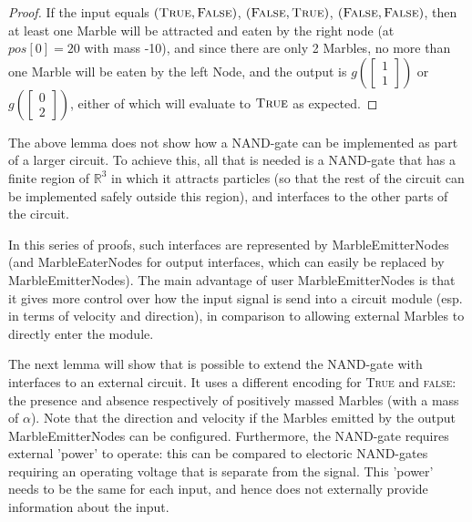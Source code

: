 \begin{proof}
    If the input equals $(\textsc{True}, \textsc{False})$, $(\textsc{False}, \textsc{True})$, $(\textsc{False}, \textsc{False})$, then at least one Marble will be attracted and eaten by the right node (at $pos[0] = 20$ with mass -10), and since there are only 2 Marbles, no more than one Marble will be eaten by the left Node, and the output is $g(\begin{bmatrix}1\\1\end{bmatrix})$ or $g(\begin{bmatrix}0\\2\end{bmatrix})$, either of which will evaluate to $\textsc{True}$ as expected.
\end{proof}

The above lemma does not show how a NAND-gate can be implemented as part of a larger circuit. To achieve this, all that is needed is a NAND-gate that has a finite region of $\mathbb{R}^3$ in which it attracts particles (so that the rest of the circuit can be implemented safely outside this region), and interfaces to the other parts of the circuit. 

In this series of proofs, such interfaces are represented by MarbleEmitterNodes (and MarbleEaterNodes for output interfaces, which can easily be replaced by MarbleEmitterNodes). The main advantage of user MarbleEmitterNodes is that it gives more control over how the input signal is send into a circuit module (esp. in terms of velocity and direction), in comparison to allowing external Marbles to directly enter the module.

The next lemma will show that is possible to extend the NAND-gate with interfaces to an external circuit. It uses a different encoding for \textsc{True} and \textsc{false}: the presence and absence respectively of positively massed Marbles (with a mass of $\alpha$). Note that the direction and velocity if the Marbles emitted by the output MarbleEmitterNodes can be configured. Furthermore, the NAND-gate requires external 'power' to operate: this can be compared to electoric NAND-gates requiring an operating voltage that is separate from the signal. This 'power' needs to be the same for each input, and hence does not externally provide information about the input.

